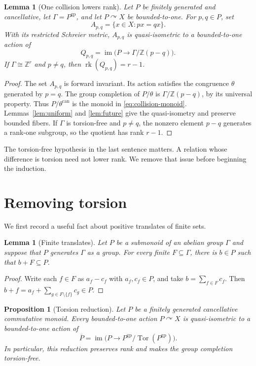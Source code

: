 \documentclass[11pt,letterpaper]{article}
\newtheorem{lemma}[theorem]{Lemma}
\newtheorem{proposition}[theorem]{Proposition}
\theoremstyle{definition}
\DeclareMathOperator{\rk}{rk}
\DeclareMathOperator{\im}{im}
\DeclareMathOperator{\Tor}{Tor}
\newcommand{\ZZ}{\mathbb Z}
\newcommand{\gp}{\mathrm{gp}}
\newcommand{\act}{\curvearrowright}
\begin{document}
\begin{lemma}[One collision lowers rank]\label{lem:collision}
Let $P$ be finitely generated and cancellative, let $\Gamma=P^{\gp}$,
and let $P\act X$ be bounded-to-one. For $p,q\in P$, set
\[
 A_{p,q}=\{x\in X:px=qx\}.
\]
With its restricted Schreier metric, $A_{p,q}$ is quasi-isometric to a
bounded-to-one action of
\begin{equation}\label{eq:collision-monoid}
 Q_{p,q}=\im\bigl(P\longrightarrow\Gamma/\ZZ(p-q)\bigr).
\end{equation}
If $\Gamma\cong\ZZ^r$ and $p\ne q$, then $\rk(Q_{p,q})=r-1$.
\end{lemma}

\begin{proof}
The set $A_{p,q}$ is forward invariant. Its action satisfies the congruence
$\theta$ generated by $p=q$. The group completion of $P/\theta$ is
$\Gamma/\ZZ(p-q)$, by its universal property. Thus
$P/\theta^{\mathrm{can}}$ is the monoid in
\eqref{eq:collision-monoid}. Lemmas~\ref{lem:uniform} and
\ref{lem:future} give the quasi-isometry and preserve bounded fibers.
If $\Gamma$ is torsion-free and $p\ne q$, the nonzero element $p-q$
generates a rank-one subgroup, so the quotient has rank $r-1$.
\end{proof}

The torsion-free hypothesis in the last sentence matters. A relation
whose difference is torsion need not lower rank. We remove that issue
before beginning the induction.

\section{Removing torsion}\label{sec:torsion}

We first record a useful fact about positive translates of finite sets.

\begin{lemma}[Finite translates]\label{lem:translate}
Let $P$ be a submonoid of an abelian group $\Gamma$ and suppose that $P$
generates $\Gamma$ as a group. For every finite $F\subseteq\Gamma$, there
is $b\in P$ such that $b+F\subseteq P$.
\end{lemma}

\begin{proof}
Write each $f\in F$ as $a_f-c_f$ with $a_f,c_f\in P$, and take
$b=\sum_{f\in F}c_f$. Then
$b+f=a_f+\sum_{g\in F\setminus\{f\}}c_g\in P$.
\end{proof}

\begin{proposition}[Torsion reduction]\label{prop:torsion}
Let $P$ be a finitely generated cancellative commutative monoid. Every
bounded-to-one action $P\act X$ is quasi-isometric to a bounded-to-one
action of
\[
 \overline P=\im\bigl(P\longrightarrow P^{\gp}/\Tor(P^{\gp})\bigr).
\]
In particular, this reduction preserves rank and makes the group
completion torsion-free.
\end{proposition}
\end{document}
